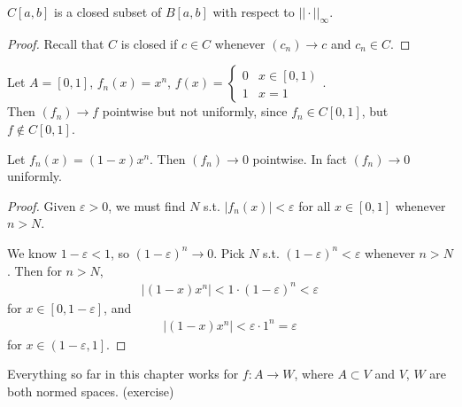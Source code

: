 \documentclass[a4paper]{article}
\begin{document}
\begin{coro}
$C\left[a,b\right]$ is a closed subset of $B\left[a,b\right]$ with respect to $||\cdot||_\infty$.
\begin{proof}
Recall that $C$ is closed if $c \in C$ whenever $\left(c_n\right) \to c$ and $c_n \in C$.
\end{proof}
\end{coro}

\begin{eg}
Let $A = \left[0,1\right]$, $f_n\left(x\right) = x^n$, $f\left(x\right) =\left\{ \begin{array}{ll} 0 & x \in \left[0,1\right) \\ 1 & x = 1\end{array}\right.$.\\
Then $\left(f_n\right) \to f$ pointwise but not uniformly, since $f_n\in C\left[0,1\right]$, but $f \not\in C\left[0,1\right]$.
\end{eg}

\begin{eg}
Let $f_n\left(x\right) = \left(1-x\right)x^n$. Then $\left(f_n\right) \to 0$ pointwise. In fact $\left(f_n\right) \to 0$ uniformly.
\begin{proof}
Given $\varepsilon>0$, we must find $N$ s.t. $|f_n\left(x\right)| < \varepsilon$ for all $x \in \left[0,1\right]$ whenever $n>N$.

We know $1-\varepsilon < 1$, so $\left(1-\varepsilon\right)^n \to 0$. Pick $N$ s.t. $\left(1-\varepsilon\right)^n < \varepsilon$ whenever $n>N$. Then for $n>N$, 
\begin{equation*}
\begin{aligned}
\left| \left(1-x\right)x^n\right| < 1 \cdot \left(1-\varepsilon\right)^n < \varepsilon
\end{aligned}
\end{equation*}
for $x \in \left[0,1-\varepsilon\right]$, and
\begin{equation*}
\begin{aligned}
\left|\left(1-x\right)x^n\right| < \varepsilon \cdot 1^n = \varepsilon
\end{aligned}
\end{equation*}
for $x \in \left(1-\varepsilon,1\right]$.
\end{proof}
\end{eg}

Everything so far in this chapter works for $f:A \to W$, where $A \subset V$ and $V$, $W$ are both normed spaces. (exercise)
\end{document}
